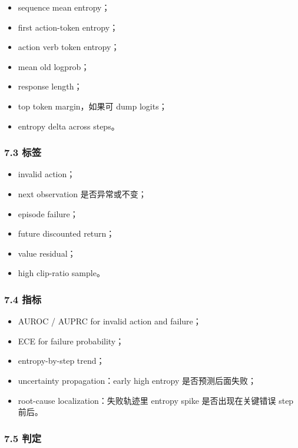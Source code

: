\documentclass[
  10pt,
]{ctexart}
\providecommand{\tightlist}{%
  \setlength{\itemsep}{0pt}\setlength{\parskip}{0pt}}
\begin{document}
\begin{itemize}
\tightlist
\item
  sequence mean entropy；
\item
  first action-token entropy；
\item
  action verb token entropy；
\item
  mean old logprob；
\item
  response length；
\item
  top token margin，如果可 dump logits；
\item
  entropy delta across steps。
\end{itemize}

\subsubsection{7.3 标签}\label{ux6807ux7b7e}

\begin{itemize}
\tightlist
\item
  invalid action；
\item
  next observation 是否异常或不变；
\item
  episode failure；
\item
  future discounted return；
\item
  value residual；
\item
  high clip-ratio sample。
\end{itemize}

\subsubsection{7.4 指标}\label{ux6307ux6807-2}

\begin{itemize}
\tightlist
\item
  AUROC / AUPRC for invalid action and failure；
\item
  ECE for failure probability；
\item
  entropy-by-step trend；
\item
  uncertainty propagation：early high entropy 是否预测后面失败；
\item
  root-cause localization：失败轨迹里 entropy spike 是否出现在关键错误
  step 前后。
\end{itemize}

\subsubsection{7.5 判定}\label{ux5224ux5b9a-3}
\end{document}
